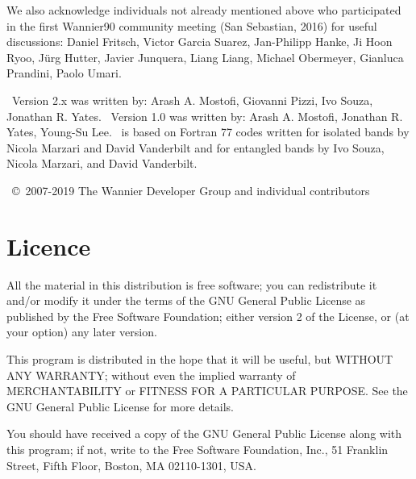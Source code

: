 We also acknowledge individuals not already mentioned above who participated in the first Wannier90 community meeting (San Sebastian, 2016) for useful discussions:
Daniel Fritsch,
Victor Garcia Suarez,
Jan-Philipp Hanke,
Ji Hoon Ryoo,
J\"urg Hutter,
Javier Junquera,
Liang Liang,
Michael Obermeyer,
Gianluca Prandini,
Paolo Umari.

\wannier\ Version 2.x was written by:
Arash A. Mostofi, Giovanni Pizzi, Ivo Souza, Jonathan R. Yates.
\wannier\ Version 1.0 was written by:
Arash A. Mostofi, Jonathan R. Yates, Young-Su Lee.
\wannier\ is based on Fortran 77 codes written for isolated bands by Nicola Marzari
and David Vanderbilt and for entangled bands by Ivo Souza, Nicola Marzari,
and David Vanderbilt.

\wannier\ \copyright\ 2007-2019 The Wannier Developer Group and individual contributors

\section*{Licence}
All the material in this distribution is free software; you can
redistribute it and/or 
modify it under the terms of the GNU General Public License
as published by the Free Software Foundation; either version 2
of the License, or (at your option) any later version.

This program is distributed in the hope that it will be useful,
but WITHOUT ANY WARRANTY; without even the implied warranty of
MERCHANTABILITY or FITNESS FOR A PARTICULAR PURPOSE.  See the
GNU General Public License for more details.

You should have received a copy of the GNU General Public License
along with this program; if not, write to the Free Software
Foundation, Inc., 51 Franklin Street, Fifth Floor, Boston, MA  02110-1301, USA.


 
